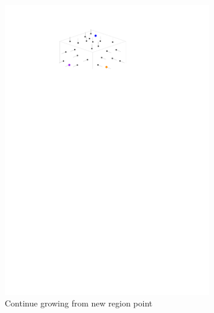 \begin{figure}[htb]
\begin{subfigure}[b]{0.3\linewidth}
		\includegraphics[width=\textwidth,page=3]{figs/region-growing.pdf}
		\caption{Continue growing from new region point}\label{fig:region-growing:c}
	\end{subfigure}
	\begin{subfigure}[b]{0.3\linewidth}
		\centering

\end{subfigure}
\end{figure}
